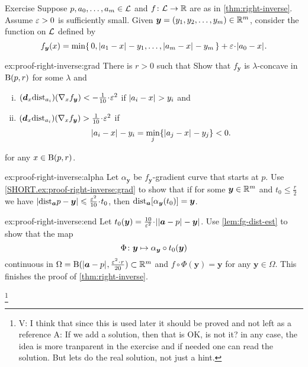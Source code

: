 \begin{thm}{Exercise}\label{ex:proof-right-inverse}
Suppose $p,a_0,\dots,a_m\in\mathcal{L}$ and $f\colon\mathcal{L}\to\mathbb{R}$ are as in \ref{thm:right-inverse}.
Assume $\varepsilon>0$ is sufficiently small.
Given $\bm{y}=(y_1,y_2,\dots,y_m)\in \mathbb{R}^m$, 
consider the function on $\mathcal{L}$ defined by
\[f_{\bm{y}}(x)=\min\{\,0, \dist{a_1}{x}{}-y_1,\dots,\dist{a_m}{x}{}-y_m\,\}+\eps\cdot\dist{a_0}{x}{}.\]

\begin{subthm}{ex:proof-right-inverse:grad}
There is $r>0$ such that 
Show that $f_{\bm{y}}$ is $\lambda$-concave in $\mathrm{B}{}(p,r)$ for some $\lambda$ and
\begin{enumerate}[(i)]
\item\label{111} $(\dd_x\distfun_{a_i})(\nabla_x f_{\bm{y}})<-\tfrac{1}{10}\cdot\eps^2$ if $\dist{a_i}{x}{}>y_i$ and
\item\label{222} $(\dd_x\distfun_{a_i})(\nabla_x f_{\bm{y}})>\tfrac{1}{10}\cdot\eps^2$ if 
\[\dist{a_i}{x}{}-y_i=\min_j\{\dist{a_j}{x}{}\z-y_j\}<0.\]
\end{enumerate}
for any $x\in \mathrm{B}{}(p,r)$.

\end{subthm}

\begin{subthm}{ex:proof-right-inverse:alpha}
Let $\alpha_{\bm{y}}$ be $f_{\bm{y}}$-gradient curve that starts at $p$.
Use \ref{SHORT.ex:proof-right-inverse:grad} to show that 
if for some $\bm{y}\in\mathbb{R}^m$ and $t_0\le\tfrac{r}{2}$ we have
$|\distfun_{\bm{a}}{p}-\bm{y}|
\le
\tfrac{\eps^2}{10}\cdot t_0$, then 
$
\mathrm{dist}_{\bm{a}}{[\alpha_{\bm{y}}(t_0)]}
= 
\bm{y}$.
\end{subthm}

\begin{subthm}{ex:proof-right-inverse:end}
Let $t_0(\bm{y})=\tfrac{10}{\eps^2}\cdot|\dist{\bm{a}}{p}{}-\bm{y}|$.
Use \ref{lem:fg-dist-est} to show that the map
\[\Phi\colon{\bm{y}}\mapsto \alpha_{\bm{y}}\circ t_0(\bm{y})\]
continuous in $\Omega=\oBall(\dist{\bm{a}}{p}{},\tfrac{\eps^2\cdot r}{20} )\subset\RR^m$
and $f\circ \Phi(\bm{y})=\bm{y}$ for any $\bm{y}\in \Omega$.
This finishes the proof of \ref{thm:right-inverse}.
\end{subthm}

\end{thm}

\footnote{\red V: I think that since this is used later it should be proved and not left as a reference
A: If we add a solution, then that is OK, is not it? in any case, the idea is more tranparent in the exercise and if needed one can read the solution. But lets do the real solution, not just a hint.}

